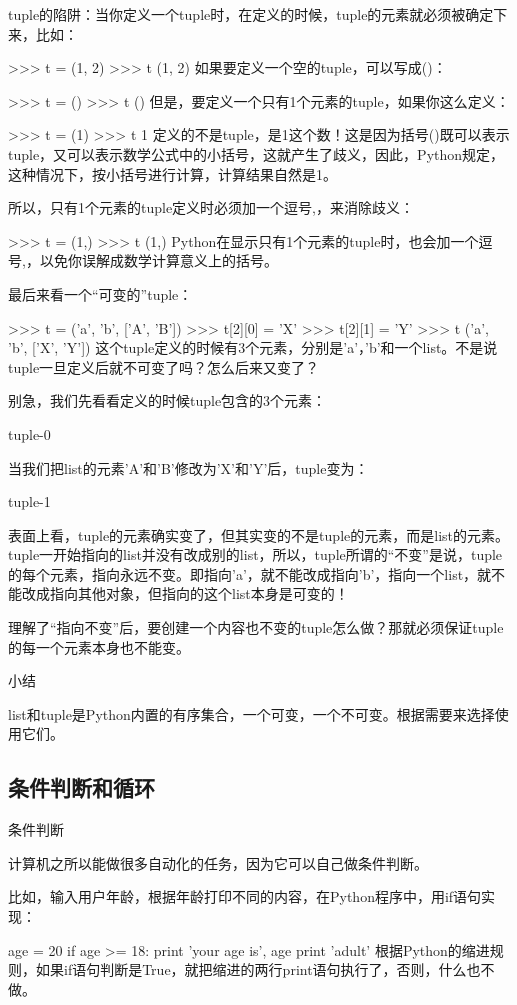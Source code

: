 tuple的陷阱：当你定义一个tuple时，在定义的时候，tuple的元素就必须被确定下来，比如：

>>> t = (1, 2)
>>> t
(1, 2)
如果要定义一个空的tuple，可以写成()：

>>> t = ()
>>> t
()
但是，要定义一个只有1个元素的tuple，如果你这么定义：

>>> t = (1)
>>> t
1
定义的不是tuple，是1这个数！这是因为括号()既可以表示tuple，又可以表示数学公式中的小括号，这就产生了歧义，因此，Python规定，这种情况下，按小括号进行计算，计算结果自然是1。

所以，只有1个元素的tuple定义时必须加一个逗号,，来消除歧义：

>>> t = (1,)
>>> t
(1,)
Python在显示只有1个元素的tuple时，也会加一个逗号,，以免你误解成数学计算意义上的括号。

最后来看一个“可变的”tuple：

>>> t = ('a', 'b', ['A', 'B'])
>>> t[2][0] = 'X'
>>> t[2][1] = 'Y'
>>> t
('a', 'b', ['X', 'Y'])
这个tuple定义的时候有3个元素，分别是'a'，'b'和一个list。不是说tuple一旦定义后就不可变了吗？怎么后来又变了？

别急，我们先看看定义的时候tuple包含的3个元素：

tuple-0

当我们把list的元素'A'和'B'修改为'X'和'Y'后，tuple变为：

tuple-1

表面上看，tuple的元素确实变了，但其实变的不是tuple的元素，而是list的元素。tuple一开始指向的list并没有改成别的list，所以，tuple所谓的“不变”是说，tuple的每个元素，指向永远不变。即指向'a'，就不能改成指向'b'，指向一个list，就不能改成指向其他对象，但指向的这个list本身是可变的！

理解了“指向不变”后，要创建一个内容也不变的tuple怎么做？那就必须保证tuple的每一个元素本身也不能变。

小结

list和tuple是Python内置的有序集合，一个可变，一个不可变。根据需要来选择使用它们。




\subsection{条件判断和循环}
条件判断

计算机之所以能做很多自动化的任务，因为它可以自己做条件判断。

比如，输入用户年龄，根据年龄打印不同的内容，在Python程序中，用if语句实现：

age = 20
if age >= 18:
    print 'your age is', age
    print 'adult'
根据Python的缩进规则，如果if语句判断是True，就把缩进的两行print语句执行了，否则，什么也不做。

